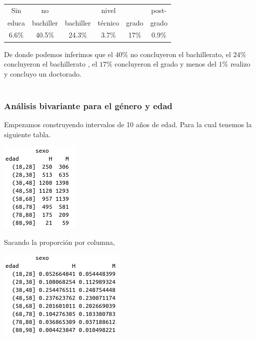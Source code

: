 \begin{multicols}{2}
\begin{center}
    \begin{tabular}{|c|c|c|c|c|c|}
	\hline
	Sin&no&&nivel&&post-\\
		     educa&bachiller&bachiller&técnico&grado&grado\\
		     \hline
			  6.6\%&40.5\%&24.3\%&3.7\%&17\%&0.9\%\\
			  \hline
    \end{tabular}
\end{center}

De donde podemos inferimos que el $40\%$ no concluyeron el bachillerato, el $24\%$ concluyeron el bachillerato , el $17\%$ concluyeron el grado y menos del $1\%$ realizo y concluyo un doctorado.\\\\

\subsubsection*{Análisis bivariante para el género y edad}
Empezamos construyendo intervalos de 10 años de edad. Para la cual tenemos la siguiente tabla. 
\begin{center}
    \includegraphics[scale = 0.6]{codigoFuente/tareas/estadistica/imagenes/tabla1.png}
\end{center}

Sacando la proporción por columna,\\
\begin{center}
    \includegraphics[scale = 0.6]{codigoFuente/tareas/estadistica/imagenes/tabla3.png}
\end{center}


\end{multicols}
